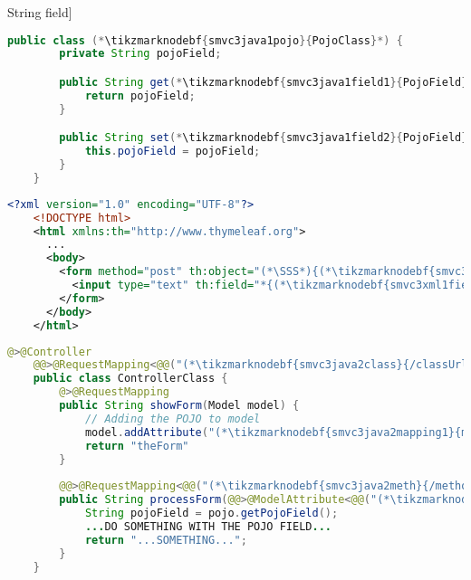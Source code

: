 \examplenonl[binding text input to \hyperref[pojo]{POJO} String field]
\enlargethispage{20mm}
\thispagestyle{empty}
\begin{lstlisting}[language=Java, title={POJO class with one String field}]
    public class (*\tikzmarknodebf{smvc3java1pojo}{PojoClass}*) {
        private String pojoField;

        public String get(*\tikzmarknodebf{smvc3java1field1}{PojoField}*)() {
            return pojoField;
        }

        public String set(*\tikzmarknodebf{smvc3java1field2}{PojoField}*)(String pojoField) {
            this.pojoField = pojoField;
        }
    }
\end{lstlisting}
\begin{lstlisting}[language=XML, title={HTML form setting the field}]
    <?xml version="1.0" encoding="UTF-8"?>
    <!DOCTYPE html>
    <html xmlns:th="http://www.thymeleaf.org">
      ...
      <body>
        <form method="post" th:object="(*\SSS*){(*\tikzmarknodebf{smvc3xml1mapping}{mappingId}[ForestGreen]*)}" th:action="@{(*\tikzmarknodebf{smvc3xml1class}{/classUrl}[ForestGreen]\tikzmarknodebf{smvc3xml1meth}{/methodUrl}[ForestGreen]*)}">
          <input type="text" th:field="*{(*\tikzmarknodebf{smvc3xml1field}{pojoField}[ForestGreen]*)}">
        </form>
      </body>
    </html>
\end{lstlisting}
\begin{lstlisting}[language=Java, title={Controller displaying and processing the form}]
    @>@Controller
    @@>@RequestMapping<@@("(*\tikzmarknodebf{smvc3java2class}{/classUrl}[ForestGreen]*)")
    public class ControllerClass {
        @>@RequestMapping
        public String showForm(Model model) {
            // Adding the POJO to model
            model.addAttribute("(*\tikzmarknodebf{smvc3java2mapping1}{mappingId}[ForestGreen]*)", new (*\tikzmarknodebf{smvc3java2pojo1}{PojoClass}*)())
            return "theForm"
        }
    
        @@>@RequestMapping<@@("(*\tikzmarknodebf{smvc3java2meth}{/methodUrl}[ForestGreen]*)")
        public String processForm(@@>@ModelAttribute<@@("(*\tikzmarknodebf{smvc3java2mapping2}{mappingId}[ForestGreen]*)") (*\tikzmarknodebf{smvc3java2pojo2}{PojoClass}*) pojo) {
            String pojoField = pojo.getPojoField();
            ...DO SOMETHING WITH THE POJO FIELD...
            return "...SOMETHING...";
        }
    }
\end{lstlisting}
\newpage

